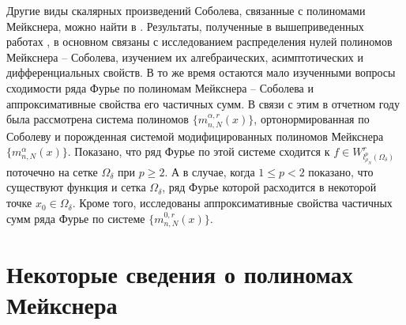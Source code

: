 Другие виды скалярных произведений Соболева, связанные с полиномами Мейкснера, можно найти в \cite{Ram-Mor-Bal, Ram-Co-So-Vil}.
Результаты, полученные в вышеприведенных работах \cite{Ram-Shar-VMJ, Ram-Ar-Go-Mar, Ram-Kh-Old, Ram-Bav1, Ram-Bav2, Ram-Shar-Sar, Ram-Mor-Bal, Ram-Co-So-Vil}, в основном связаны с исследованием распределения нулей полиномов Мейкснера --  Соболева, изучением их алгебраических, асимптотических и дифференциальных свойств. В то же время остаются мало изученными вопросы сходимости ряда Фурье по полиномам Мейкснера -- Соболева и аппроксимативные свойства его частичных сумм. В связи с этим в отчетном году была рассмотрена система полиномов $\{m_{n,N}^{\alpha,r}(x)\}$, ортонормированная по Соболеву и порожденная системой модифицированных полиномов Мейкснера $\{m_{n,N}^{\alpha}(x)\}$.
Показано, что ряд Фурье по этой системе сходится к $f\in W^r_{l^p_{\rho_N}(\Omega_\delta)}$ поточечно на сетке $\Omega_\delta$ при $p\ge2$. А в случае, когда $1\le p<2$ показано, что существуют функция и сетка $\Omega_\delta$, ряд Фурье которой расходится в некоторой точке $x_0\in\Omega_\delta$. Кроме того, исследованы аппроксимативные свойства частичных сумм ряда Фурье по системе $\{m_{n,N}^{0,r}(x)\}$.

\section{Некоторые сведения о полиномах Мейкснера}

